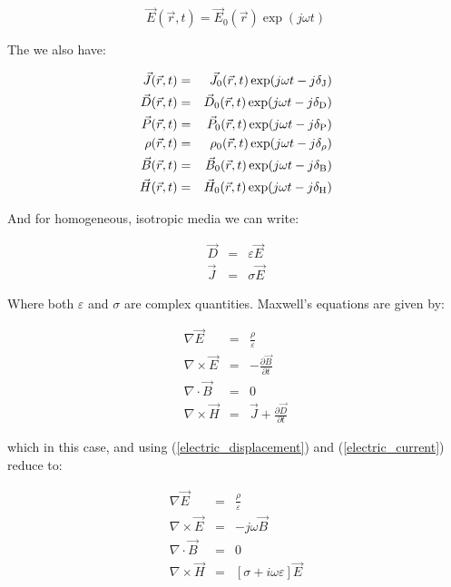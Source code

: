 \documentclass[12pt]{report}
\begin{document}
\begin{equation}\vec{E}(\vec{r},t)=\vec{E}_0(\vec{r})\exp(j\omega t)\end{equation}

The we also have:

\begin{eqnarray}\vec{J}(\vec{r},t)&=&\vec{J}_0(\vec{r},t)\exp(j\omega t-j\delta_{\rm{J}})\\\vec{D}(\vec{r},t)&=&\vec{D}_0(\vec{r},t)\exp(j\omega t-j\delta_{\rm{D}})\\\vec{P}(\vec{r},t)&=&\vec{P}_0(\vec{r},t)\exp(j\omega t-j\delta_{\rm{P}})\\\rho(\vec{r},t)&=&\rho_0(\vec{r},t)\exp(j\omega t-j\delta_\rho)\\\vec{B}(\vec{r},t)&=&\vec{B}_0(\vec{r},t)\exp(j\omega t-j\delta_{\rm{B}})\\\vec{H}(\vec{r},t)&=&\vec{H}_0(\vec{r},t)\exp(j\omega t-j\delta_{\rm{H}})\end{eqnarray}

And for homogeneous, isotropic media we can write:

\begin{eqnarray}
\vec{D}&=&\varepsilon\vec{E}\label{electric_displacement}\\
\vec{J}&=&\sigma\vec{E}\label{electric_current}
\end{eqnarray}

Where both $\varepsilon$ and $\sigma$ are complex quantities. Maxwell's equations are given by:

\begin{eqnarray}
\nabla\vec{E}&=&\frac{\rho}{\varepsilon}\\\nabla\times\vec{E}&=&-\frac{\partial\vec{B}}{\partial t}\\
\nabla\cdot\vec{B}&=&0\\\nabla\times\vec{H}&=&\vec{J}+\frac{\partial\vec{D}}{\partial t}
\end{eqnarray}

which in this case, and using (\ref{electric_displacement}) and (\ref{electric_current}) reduce to:

\begin{eqnarray}
\nabla\vec{E}&=&\frac{\rho}{\varepsilon}\label{divE}\\\nabla\times\vec{E}&=&-j\omega\vec{B}\\
\nabla\cdot\vec{B}&=&0\\\nabla\times\vec{H}&=&\left[\sigma+i\omega\varepsilon\right]\vec{E}
\end{eqnarray}
\end{document}
